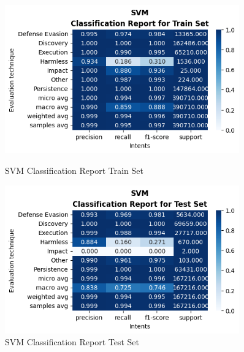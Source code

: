 \begin{figure}[H]
            \vspace{0.5cm}  %

            \begin{minipage}{\textwidth}
                \begin{minipage}[t]{0.48\textwidth}
                    \centering
                    \includegraphics[width=0.9\textwidth]{../figures/plots/section2/SVM_classification_report_for_Train_set.png}
                    \caption{SVM Classification Report Train Set}
                    \label{fig:svm_cm_train}
                \end{minipage}%
                \hfill%
                \begin{minipage}[t]{0.48\textwidth}
                    \centering
                    \includegraphics[width=0.9\textwidth]{../figures/plots/section2/SVM_classification_report_for_Test_set.png}
                    \caption{SVM Classification Report Test Set}
                    \label{fig:svm_cm_test}
                \end{minipage}  
            
            \end{minipage}
            
        \end{figure}
        
